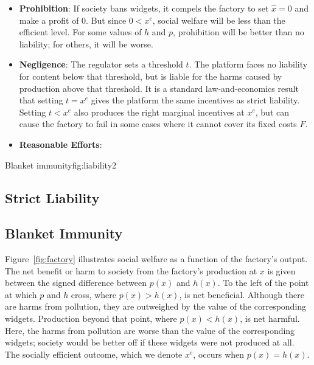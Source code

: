 \begin{itemize}
\item \textbf{Prohibition}: If society bans widgets, it compels the factory to set $\hat{x} = 0$ and make a profit of $0$. But since $0 < x^e$, social welfare will be less than the efficient level. For some values of $h$ and $p$, prohibition will be better than no liability; for others, it will be worse.
\item \textbf{Negligence}: The regulator sets a threshold $t$. The platform faces no liability for content below that threshold, but is liable for the harms caused by production above that threshold. It is a standard law-and-economics result that setting $t = x^e$ gives the platform the same incentives as strict liability. Setting $t < x^e$ also produces the right marginal incentives at $x^e$, but can cause the factory to fail in some cases where it cannot cover its fixed costs $F$.
\item \textbf{Reasonable Efforts}: 
\end{itemize}


\begin{econ}{Blanket immunity}{fig:liability2}
\end{econ}







\subsection{Strict Liability}





\subsection{Blanket Immunity}









Figure~\ref{fig:factory} illustrates social welfare as a function of the factory's output. The net benefit or harm to society from the factory's production at $x$ is given between the signed difference between $p(x)$ and $h(x)$. To the left of the point at which $p$ and $h$ cross, where $p(x) > h(x)$, is net beneficial. Although there are harms from pollution, they are outweighed by the value of the corresponding widgets. Production beyond that point, where $p(x) < h(x)$, is net harmful. Here, the harms from pollution are worse than the value of the corresponding widgets; society would be better off if these widgets were not produced at all. The socially efficient outcome, which we denote $x^e$, occurs when $p(x) = h(x)$. 



